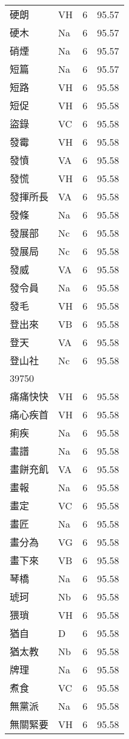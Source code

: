 \documentclass[twocolumn]{book}
\begin{document}
\begin{supertabular}{llrr}
硬朗 & VH & 6 &  95.57\\
硬木 & Na & 6 &  95.57\\
硝煙 & Na & 6 &  95.57\\
短篇 & Na & 6 &  95.57\\
短路 & VH & 6 &  95.58\\
短促 & VH & 6 &  95.58\\
盜錄 & VC & 6 &  95.58\\
發霉 & VH & 6 &  95.58\\
發憤 & VA & 6 &  95.58\\
發慌 & VH & 6 &  95.58\\
發揮所長 & VA & 6 &  95.58\\
發條 & Na & 6 &  95.58\\
發展部 & Nc & 6 &  95.58\\
發展局 & Nc & 6 &  95.58\\
發威 & VA & 6 &  95.58\\
發令員 & Na & 6 &  95.58\\
發毛 & VH & 6 &  95.58\\
登出來 & VB & 6 &  95.58\\
登天 & VA & 6 &  95.58\\
登山社 & Nc & 6 &  95.58\\
39750\\
痛痛快快 & VH & 6 &  95.58\\
痛心疾首 & VH & 6 &  95.58\\
痢疾 & Na & 6 &  95.58\\
畫譜 & Na & 6 &  95.58\\
畫餅充飢 & VA & 6 &  95.58\\
畫報 & Na & 6 &  95.58\\
畫定 & VC & 6 &  95.58\\
畫匠 & Na & 6 &  95.58\\
畫分為 & VG & 6 &  95.58\\
畫下來 & VB & 6 &  95.58\\
琴橋 & Na & 6 &  95.58\\
琥珂 & Nb & 6 &  95.58\\
猥瑣 & VH & 6 &  95.58\\
猶自 & D & 6 &  95.58\\
猶太教 & Nb & 6 &  95.58\\
牌理 & Na & 6 &  95.58\\
煮食 & VC & 6 &  95.58\\
無黨派 & Na & 6 &  95.58\\
無關緊要 & VH & 6 &  95.58\\

\end{supertabular}
\end{document}
